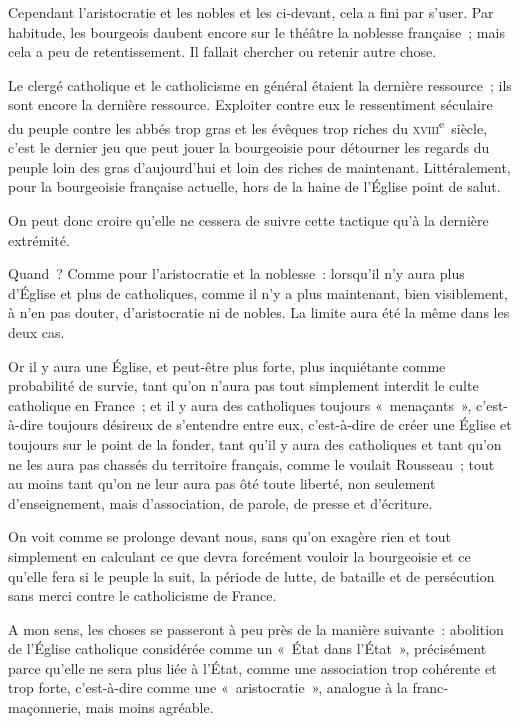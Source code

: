 \documentclass[french,twoside]{book} %
\begin{document}
 Cependant l’aristocratie et les nobles et les ci-devant, cela a fini par s’user. Par habitude, les bourgeois daubent encore sur le théâtre la noblesse française ; mais cela a peu de retentissement. Il fallait chercher ou retenir autre chose.\par
Le clergé catholique et le catholicisme en général étaient la dernière ressource ; ils sont encore la dernière ressource. Exploiter contre eux le ressentiment séculaire du peuple contre les abbés trop gras et les évêques trop riches du \textsc{xviii}\textsuperscript{e} siècle, c’est le dernier jeu que peut jouer la bourgeoisie pour détourner les regards du peuple loin des gras d’aujourd’hui et loin des riches de maintenant. Littéralement, pour la bourgeoisie française actuelle, hors de la haine de l’Église point de salut.\par
On peut donc croire qu’elle ne cessera de suivre cette tactique qu’à la dernière extrémité.\par
Quand ? Comme pour l’aristocratie et la noblesse : lorsqu’il n’y aura plus d’Église et plus de catholiques, comme il n’y a plus maintenant, bien visiblement, à n’en pas douter, d’aristocratie ni de nobles. La limite aura été la même dans les deux cas.\par
Or il y aura une Église, et peut-être plus forte, plus inquiétante comme probabilité de survie, tant qu’on n’aura pas tout simplement interdit le culte catholique en France ; et il y aura des catholiques  toujours « menaçants », c’est-à-dire toujours désireux de s’entendre entre eux, c’est-à-dire de créer une Église et toujours sur le point de la fonder, tant qu’il y aura des catholiques et tant qu’on ne les aura pas chassés du territoire français, comme le voulait Rousseau ; tout au moins tant qu’on ne leur aura pas ôté toute liberté, non seulement d’enseignement, mais d’association, de parole, de presse et d’écriture.\par
On voit comme se prolonge devant nous, sans qu’on exagère rien et tout simplement en calculant ce que devra forcément vouloir la bourgeoisie et ce qu’elle fera si le peuple la suit, la période de lutte, de bataille et de persécution sans merci contre le catholicisme de France.\par
A mon sens, les choses se passeront à peu près de la manière suivante : abolition de l’Église catholique considérée comme un « État dans l’État », précisément parce qu’elle ne sera plus liée à l’État, comme une association trop cohérente et trop forte, c’est-à-dire comme une « aristocratie », analogue à la franc-maçonnerie, mais moins agréable.\par
\end{document}
